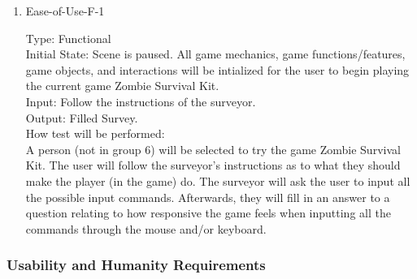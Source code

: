 \documentclass[12pt, titlepage]{article}
\newcounter{ftnum}
\newcounter{nftnum}
\begin{document}
\begin{enumerate}
	\item{Ease-of-Use-F-1\\}  \label{NF3}
	
	Type: Functional \\
	
	Initial State: Scene is paused. All game mechanics, game functions/features, game objects, and interactions will be intialized for the user to begin playing the current game Zombie Survival Kit. \\
	
	Input: Follow the instructions of the surveyor. \\
	
	Output: Filled Survey. \\
	
	How test will be performed:\\ A person (not in group 6) will be selected to try the game Zombie Survival Kit. The user will follow the surveyor's instructions as to what they should make the player (in the game) do. 
	The surveyor will ask the user to input all the possible input commands.
	Afterwards, they will fill in an answer to a question relating to how responsive the game feels when inputting all the commands through the mouse and/or keyboard.\\
	
\end{enumerate}

\subsubsection{Usability and Humanity Requirements}
\end{document}
